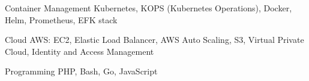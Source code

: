 


\begin{cvskills}


\cvskill
{Container Management} %
{Kubernetes, KOPS (Kubernetes Operations), Docker, Helm, Prometheus, EFK stack} %


\cvskill
{Cloud} %
{AWS: EC2, Elastic Load Balancer, AWS Auto Scaling, S3, Virtual Private Cloud, Identity and Access Management} %


\cvskill
{Programming} %
{PHP, Bash, Go, JavaScript} %


\end{cvskills}
